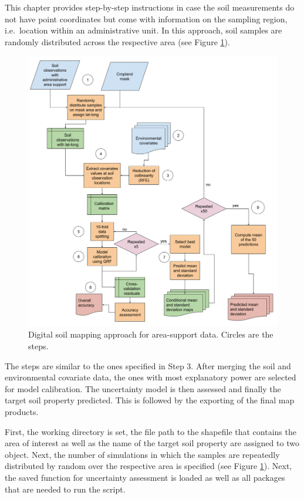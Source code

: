 \documentclass[
  10pt,
  b5paper,
  oneside]{book}
\begin{document}
This chapter provides step-by-step instructions in case the soil measurements do not have point coordinates but come with information on the sampling region, i.e.~location within an administrative unit. In this approach, soil samples are randomly distributed across the respective area (see Figure \ref{fig:workflow2}).

\begin{figure}
\includegraphics[width=1\linewidth]{images/workflow_county_data} \caption{Digital soil mapping approach for area-support data. Circles are the steps.}\label{fig:workflow2}
\end{figure}

The steps are similar to the ones specified in Step 3. After merging the soil and environmental covariate data, the ones with most explanatory power are selected for model calibration. The uncertainty model is then assessed and finally the target soil property predicted. This is followed by the exporting of the final map products.

First, the working directory is set, the file path to the shapefile that contains the area of interest as well as the name of the target soil property are assigned to two object. Next, the number of simulations in which the samples are repeatedly distributed by random over the respective area is specified (see Figure \ref{fig:workflow2}). Next, the saved function for uncertainty assessment is loaded as well as all packages that are needed to run the script.
\end{document}
